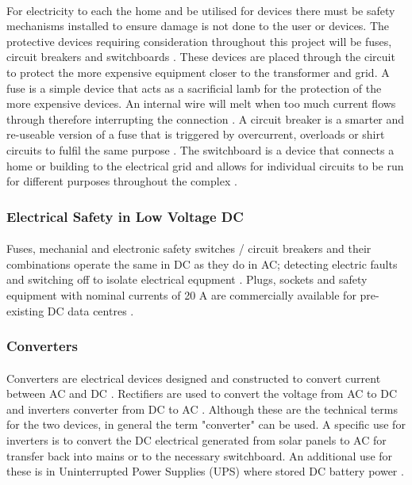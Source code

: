 \paragraph{}
For electricity to each the home and be utilised for devices there must be safety
mechanisms installed to ensure damage is not done to the user or devices. The protective
devices requiring consideration throughout this project will be fuses, circuit breakers
and switchboards \cite{UnitedStatesDepartmentoftheInterior2000}. These devices are placed through the circuit to protect the more expensive equipment closer to the transformer and grid. A fuse is a simple device that acts as a sacrificial lamb for the protection of the more expensive devices. An internal wire will melt when too much current flows through therefore interrupting the connection
\cite{UnitedStatesDepartmentoftheInterior2000}. A circuit breaker is a smarter and re-useable version of a fuse that is triggered by overcurrent, overloads or shirt circuits to fulfil the same purpose \cite{UnitedStatesDepartmentoftheInterior2000}. The switchboard is
a device that connects a home or building to the electrical grid and allows for individual
circuits to be run for different purposes throughout the complex \cite{UnitedStatesDepartmentoftheInterior2000}.

\subsubsection{Electrical Safety in Low Voltage DC}

\paragraph{}
Fuses, mechanial and electronic safety switches / circuit breakers and their combinations operate the same in DC as they do in AC; detecting electric faults and switching off to isolate electrical equpment \cite{Meckler2014}. Plugs, sockets and safety equipment with nominal currents of 20 \si{A} are commercially available for pre-existing DC data centres \cite{Meckler2014}. 

\subsubsection{Converters}

\paragraph{}
Converters are electrical devices designed and constructed to convert current between AC and DC \cite{website:ConvVsInverter}. Rectifiers are used to convert the voltage from AC to DC and inverters converter from DC to AC \cite{website:ConvVsInverter}. Although these are the technical terms for the two devices, in general the term "converter" can be used. A specific use for inverters is to convert the DC electrical generated from solar panels to AC for transfer back into mains or to the necessary switchboard. An additional use for these is in Uninterrupted Power Supplies (UPS) where stored DC battery power \cite{website:ConvVsInverter}.

